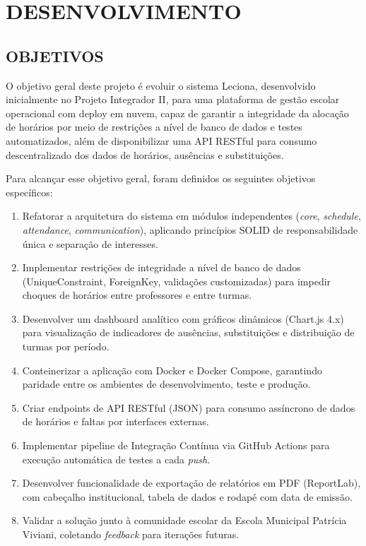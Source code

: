 \chapter{DESENVOLVIMENTO}

\section[Objetivos]{OBJETIVOS}

O objetivo geral deste projeto é evoluir o sistema Leciona, desenvolvido inicialmente no Projeto Integrador II, para uma plataforma de gestão escolar operacional com deploy em nuvem, capaz de garantir a integridade da alocação de horários por meio de restrições a nível de banco de dados e testes automatizados, além de disponibilizar uma API RESTful para consumo descentralizado dos dados de horários, ausências e substituições.

Para alcançar esse objetivo geral, foram definidos os seguintes objetivos específicos:

\begin{enumerate}
    \item Refatorar a arquitetura do sistema em módulos independentes (\textit{core}, \textit{schedule}, \textit{attendance}, \textit{communication}), aplicando princípios SOLID de responsabilidade única e separação de interesses.
    \item Implementar restrições de integridade a nível de banco de dados (UniqueConstraint, ForeignKey, validações customizadas) para impedir choques de horários entre professores e entre turmas.
    \item Desenvolver um dashboard analítico com gráficos dinâmicos (Chart.js 4.x) para visualização de indicadores de ausências, substituições e distribuição de turmas por período.
    \item Conteinerizar a aplicação com Docker e Docker Compose, garantindo paridade entre os ambientes de desenvolvimento, teste e produção.
    \item Criar endpoints de API RESTful (JSON) para consumo assíncrono de dados de horários e faltas por interfaces externas.
    \item Implementar pipeline de Integração Contínua via GitHub Actions para execução automática de testes a cada \textit{push}.
    \item Desenvolver funcionalidade de exportação de relatórios em PDF (ReportLab), com cabeçalho institucional, tabela de dados e rodapé com data de emissão.
    \item Validar a solução junto à comunidade escolar da Escola Municipal Patrícia Viviani, coletando \textit{feedback} para iterações futuras.
\end{enumerate}


